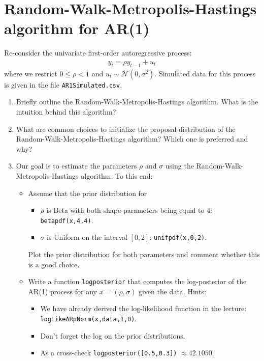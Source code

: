 \documentclass{article}
\begin{document}
\printbibliography%

\newpage

\section{Random-Walk-Metropolis-Hastings algorithm for AR{(1)}}
Re-consider the univariate first-order autoregressive process:
\begin{align*}
y_t = \rho y_{t-1} + u_t
\end{align*}
where we restrict \(0\leq \rho <1\) and \(u_t \sim \mathcal{N}(0,\sigma^2)\).
Simulated data for this process is given in the file \texttt{AR1Simulated.csv}.

\begin{enumerate}
\item Briefly outline the Random-Walk-Metropolis-Hastings algorithm.
What is the intuition behind this algorithm?

\item What are common choices to initialize the proposal distribution of the Random-Walk-Metropolis-Hastings algorithm?
Which one is preferred and why?

\item Our goal is to estimate the parameters \(\rho \) and \(\sigma \) using the Random-Walk-Metropolis-Hastings algorithm.
To this end:
\begin{itemize}
\item Assume that the prior distribution for
  \begin{itemize}
  \item \(\rho \) is Beta with both shape parameters being equal to 4: \texttt{betapdf(x,4,4)}.
  \item \(\sigma \) is Uniform on the interval \([0,2]\): \texttt{unifpdf(x,0,2)}.
  \end{itemize}
Plot the prior distribution for both parameters and comment whether this is a good choice.

\item Write a function \texttt{logposterior} that computes the log-posterior of the AR{(1)} process for any \(x=(\rho,\sigma)\) given the data.
Hints:
  \begin{itemize}
  \item We have already derived the log-likelihood function in the lecture:\\\texttt{logLikeARpNorm(x,data,1,0)}.
  \item Don't forget the log on the prior distributions.
  \item As a cross-check \texttt{logposterior{({[0.5,0.3]})}} \(\approx 42.1050\).
  \end{itemize}


\end{itemize}
\end{enumerate}
\end{document}

